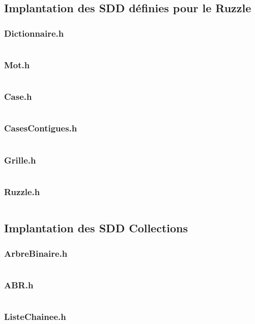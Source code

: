 \newcommand{\codeC}[1]{
  \inputminted[linenos,breaklines,breakanywhere,xleftmargin=-30pt,xrightmargin=-70pt]
  {C}{#1}\newpage}

\subsection{Implantation des SDD définies pour le Ruzzle}
  \subsubsection{Dictionnaire.h}
    \codeC{../../include/Dictionnaire.h}
  \subsubsection{Mot.h}
    \codeC{../../include/Mot.h}
  \subsubsection{Case.h}
    \codeC{../../include/Case.h}
  \subsubsection{CasesContigues.h}
    \codeC{../../include/CasesContigues.h}
  \subsubsection{Grille.h}
    \codeC{../../include/Grille.h}
  \subsubsection{Ruzzle.h}
    \codeC{../../include/Ruzzle.h}

\subsection{Implantation des SDD Collections}
  \subsubsection{ArbreBinaire.h}
    \codeC{../../include/ArbreBinaire.h}
  \subsubsection{ABR.h}
    \codeC{../../include/ABR.h}
  \subsubsection{ListeChainee.h}
    \codeC{../../include/ListeChainee.h}
